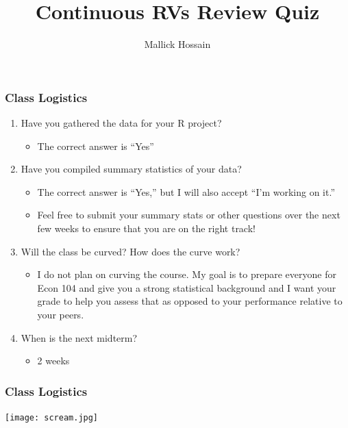 \documentclass{beamer}
\title{Continuous RVs Review Quiz}
\author{Mallick Hossain}
\date{}
\institute{University of Pennsylvania}
\begin{document}
\begin{frame}
	\titlepage 
\end{frame} 

\begin{frame}
\frametitle{Class Logistics}
    \begin{enumerate}[<+- | alert@+>]
        \item Have you gathered the data for your R project?
        \begin{itemize}
	        	\item The correct answer is ``Yes''
        \end{itemize}
        \item Have you compiled summary statistics of your data?
   			\begin{itemize}
        		\item The correct answer is ``Yes,'' but I will also accept ``I'm working on it.''
        		\item Feel free to submit your summary stats or other questions over the next few weeks to ensure that you are on the right track!
        \end{itemize}
        \item Will the class be curved? How does the curve work?
        \begin{itemize}
        	\item I do not plan on curving the course. My goal is to prepare everyone for Econ 104 and give you a strong statistical background and I want your grade to help you assess that as opposed to your performance relative to your peers.
        \end{itemize}
       \item When is the next midterm?
       	\begin{itemize}
       		\item 2 weeks 
       	\end{itemize}
    \end{enumerate}
\end{frame} 

\begin{frame}
\frametitle{Class Logistics}
\centering
\texttt{[image: scream.jpg]}
\end{frame} 
\end{document}
